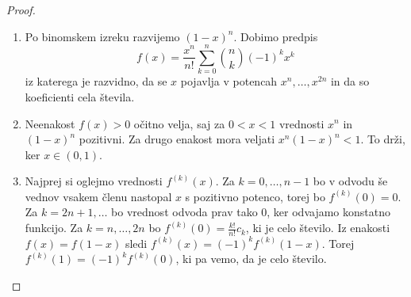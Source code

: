 \documentclass[a4paper]{article}
\theoremstyle{plain}
\newcommand{\odvod}[1]{f^{({#1})}(x)}
\begin{document}
\begin{proof}
\begin{enumerate}
\item Po binomskem izreku razvijemo $(1-x)^n$. Dobimo predpis
\begin{equation*}
f(x) = \frac{x^n}{n!}\sum_{k=0}^{n}\binom{n}{k}(-1)^kx^k
\end{equation*}
iz katerega je razvidno, da se $x$ pojavlja v potencah $x^n,\dots, x^{2n}$ in da so koeficienti cela števila.
\item Neenakost $f(x)>0$ očitno velja, saj za $0<x<1$ vrednosti $x^n$ in $(1-x)^n$ pozitivni. Za drugo enakost mora veljati $x^n(1-x)^n<1$. To drži, ker $x\in(0,1)$.
\item Najprej si oglejmo vrednosti $\odvod{k}$. Za $k=0,\dots,n-1$ bo v odvodu še vednov vsakem členu nastopal $x$ s pozitivno potenco, torej bo $f^{(k)}(0)=0$. Za $k=2n+1,\dots$ bo vrednost odvoda prav tako 0, ker odvajamo konstatno funkcijo. Za $k=n,\dots,2n$ bo $f^{(k)}(0) = \frac{k!}{n!}c_k$, ki je celo število. Iz enakosti $f(x)=f(1-x)$ sledi $\odvod{k}= (-1)^k f^{(k)}(1-x)$. Torej $f^{(k)}(1)= (-1)^k f^{(k)}(0)$, ki pa vemo, da je celo število.
\end{enumerate}
\end{proof}
\end{document}
